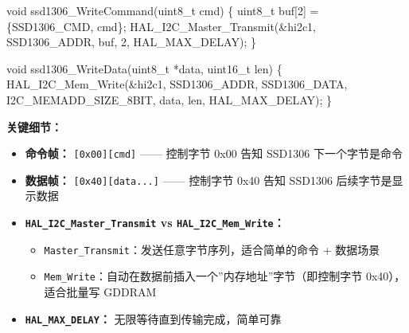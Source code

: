 \documentclass[
  chinese,
  UTF8,
  oneside,
  openany]{ctexbook}
\newenvironment{Shaded}{}{}
\newcommand{\DataTypeTok}[1]{\textcolor[rgb]{0.56,0.13,0.00}{#1}}
\newcommand{\DecValTok}[1]{\textcolor[rgb]{0.25,0.63,0.44}{#1}}
\newcommand{\NormalTok}[1]{#1}
\newcommand{\OperatorTok}[1]{\textcolor[rgb]{0.40,0.40,0.40}{#1}}
\providecommand{\tightlist}{%
  \setlength{\itemsep}{0pt}\setlength{\parskip}{0pt}}
\begin{document}
\begin{Shaded}
\begin{Highlighting}[]
\DataTypeTok{void}\NormalTok{ ssd1306\_WriteCommand}\OperatorTok{(}\DataTypeTok{uint8\_t}\NormalTok{ cmd}\OperatorTok{)}
\OperatorTok{\{}
    \DataTypeTok{uint8\_t}\NormalTok{ buf}\OperatorTok{[}\DecValTok{2}\OperatorTok{]} \OperatorTok{=} \OperatorTok{\{}\NormalTok{SSD1306\_CMD}\OperatorTok{,}\NormalTok{ cmd}\OperatorTok{\};}
\NormalTok{    HAL\_I2C\_Master\_Transmit}\OperatorTok{(\&}\NormalTok{hi2c1}\OperatorTok{,}\NormalTok{ SSD1306\_ADDR}\OperatorTok{,}\NormalTok{ buf}\OperatorTok{,} \DecValTok{2}\OperatorTok{,}\NormalTok{ HAL\_MAX\_DELAY}\OperatorTok{);}
\OperatorTok{\}}

\DataTypeTok{void}\NormalTok{ ssd1306\_WriteData}\OperatorTok{(}\DataTypeTok{uint8\_t} \OperatorTok{*}\NormalTok{data}\OperatorTok{,} \DataTypeTok{uint16\_t}\NormalTok{ len}\OperatorTok{)}
\OperatorTok{\{}
\NormalTok{    HAL\_I2C\_Mem\_Write}\OperatorTok{(\&}\NormalTok{hi2c1}\OperatorTok{,}\NormalTok{ SSD1306\_ADDR}\OperatorTok{,}\NormalTok{ SSD1306\_DATA}\OperatorTok{,}
\NormalTok{                      I2C\_MEMADD\_SIZE\_8BIT}\OperatorTok{,}\NormalTok{ data}\OperatorTok{,}\NormalTok{ len}\OperatorTok{,}\NormalTok{ HAL\_MAX\_DELAY}\OperatorTok{);}
\OperatorTok{\}}
\end{Highlighting}
\end{Shaded}

\textbf{关键细节：}

\begin{itemize}
\tightlist
\item
  \textbf{命令帧：} \texttt{{[}0x00{]}{[}cmd{]}} ------ 控制字节 0x00
  告知 SSD1306 下一个字节是命令
\item
  \textbf{数据帧：} \texttt{{[}0x40{]}{[}data...{]}} ------ 控制字节
  0x40 告知 SSD1306 后续字节是显示数据
\item
  \textbf{\texttt{HAL\_I2C\_Master\_Transmit} vs
  \texttt{HAL\_I2C\_Mem\_Write}：}

  \begin{itemize}
  \tightlist
  \item
    \texttt{Master\_Transmit}：发送任意字节序列，适合简单的命令 +
    数据场景
  \item
    \texttt{Mem\_Write}：自动在数据前插入一个''内存地址''字节（即控制字节
    0x40），适合批量写 GDDRAM
  \end{itemize}
\item
  \textbf{\texttt{HAL\_MAX\_DELAY}：} 无限等待直到传输完成，简单可靠
\end{itemize}
\end{document}
